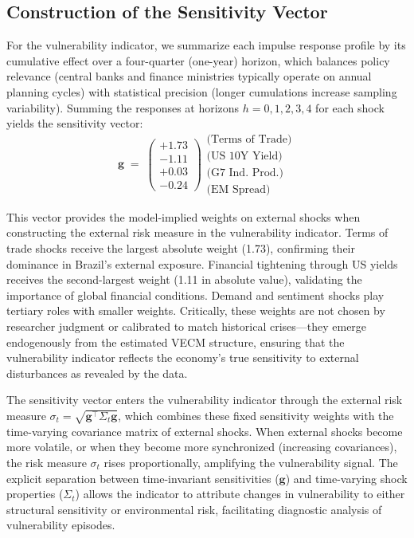 \documentclass[12pt,a4paper]{article}
\numberwithin{equation}{section}
\theoremstyle{definition}
\theoremstyle{remark}
\newcommand{\vect}[1]{\boldsymbol{#1}}
\begin{document}
\subsection{Construction of the Sensitivity Vector}

For the vulnerability indicator, we summarize each impulse response profile by its cumulative effect over a four-quarter (one-year) horizon, which balances policy relevance (central banks and finance ministries typically operate on annual planning cycles) with statistical precision (longer cumulations increase sampling variability). Summing the responses at horizons $h=0,1,2,3,4$ for each shock yields the sensitivity vector:
\begin{equation}
\label{eq:sensitivity_vector}
\vect{g} \;=\; 
\begin{pmatrix}
+1.73 \\
-1.11 \\
+0.03 \\
-0.24
\end{pmatrix}
\begin{matrix}
\text{(Terms of Trade)} \\
\text{(US 10Y Yield)} \\
\text{(G7 Ind. Prod.)} \\
\text{(EM Spread)}
\end{matrix}
\end{equation}

This vector provides the model-implied weights on external shocks when constructing the external risk measure in the vulnerability indicator. Terms of trade shocks receive the largest absolute weight (1.73), confirming their dominance in Brazil's external exposure. Financial tightening through US yields receives the second-largest weight (1.11 in absolute value), validating the importance of global financial conditions. Demand and sentiment shocks play tertiary roles with smaller weights. Critically, these weights are not chosen by researcher judgment or calibrated to match historical crises---they emerge endogenously from the estimated VECM structure, ensuring that the vulnerability indicator reflects the economy's true sensitivity to external disturbances as revealed by the data.

The sensitivity vector enters the vulnerability indicator through the external risk measure $\sigma_t = \sqrt{\vect{g}^\top \Sigma_t \vect{g}}$, which combines these fixed sensitivity weights with the time-varying covariance matrix of external shocks. When external shocks become more volatile, or when they become more synchronized (increasing covariances), the risk measure $\sigma_t$ rises proportionally, amplifying the vulnerability signal. The explicit separation between time-invariant sensitivities ($\vect{g}$) and time-varying shock properties ($\Sigma_t$) allows the indicator to attribute changes in vulnerability to either structural sensitivity or environmental risk, facilitating diagnostic analysis of vulnerability episodes.
\end{document}
